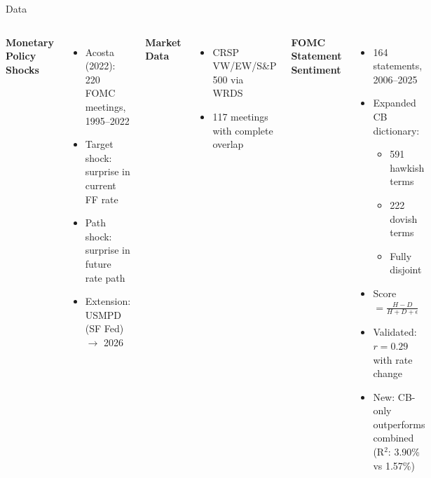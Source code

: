 \documentclass[aspectratio=169, 11pt]{beamer}
\begin{document}
\begin{frame}{Data}
\begin{columns}[T]
\textbf{Monetary Policy Shocks}
\begin{itemize}
  \item Acosta (2022): 220 FOMC meetings, 1995--2022
  \item \textcolor{accent}{Target shock}: surprise in current FF rate
  \item \textcolor{alertc}{Path shock}: surprise in future rate path
  \item Extension: USMPD (SF Fed) $\rightarrow$ 2026
\end{itemize}

\vspace{0.5em}
\textbf{Market Data}
\begin{itemize}
  \item CRSP VW/EW/S\&P 500 via WRDS
  \item 117 meetings with complete overlap
\end{itemize}

\textbf{FOMC Statement Sentiment}
\begin{itemize}
  \item 164 statements, 2006--2025
  \item Expanded CB dictionary:
    \begin{itemize}
      \item 591 hawkish terms
      \item 222 dovish terms
      \item Fully disjoint
    \end{itemize}
  \item Score $= \frac{H - D}{H + D + \epsilon}$
  \item Validated: $r = 0.29$ with rate change
  \item \textcolor{success}{New:} CB-only outperforms combined (R$^2$: 3.90\% vs 1.57\%)
\end{itemize}
\end{columns}
\end{frame}
\end{document}
